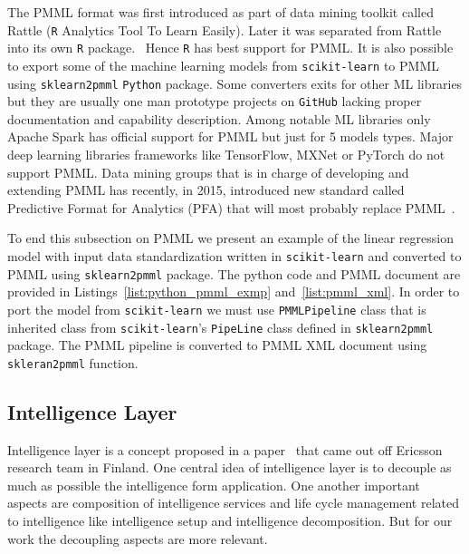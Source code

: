\documentclass[english, 12pt, a4paper, elec, utf8, online]{aaltothesis}
\begin{document}
The PMML format was first introduced as part of data mining toolkit called Rattle (\texttt{R} Analytics Tool To Learn Easily). Later it was separated from Rattle into its own \texttt{R} package.~\cite{guazzelli2009pmml} Hence \texttt{R} has best support for PMML. It is also possible to export some of the machine learning models from \texttt{scikit-learn} to PMML using \texttt{sklearn2pmml} \texttt{Python} package. Some converters exits for other ML libraries but they are usually one man prototype projects on \texttt{GitHub} lacking proper documentation and capability description. Among notable ML libraries only Apache Spark has official support for PMML but just for 5 models types. Major deep learning libraries frameworks like TensorFlow, MXNet or PyTorch do not support PMML. Data mining groups that is in charge of developing and extending PMML has recently, in 2015, introduced new standard called Predictive Format for Analytics (PFA) that will most probably replace PMML~\cite{pfa}.  



To end this subsection on PMML we present an example of the linear regression model with input data standardization written in \texttt{scikit-learn} and converted to PMML using \texttt{sklearn2pmml} package. The python code and PMML document are provided in Listings~\ref{list:python_pmml_exmp} and~\ref{list:pmml_xml}. In order to port the model from \texttt{scikit-learn} we must use \texttt{PMMLPipeline} class that is inherited class from \texttt{scikit-learn}'s \texttt{PipeLine} class defined in \texttt{sklearn2pmml} package. The PMML pipeline is converted to PMML XML document using \texttt{skleran2pmml} function. 



\subsection{Intelligence Layer}
Intelligence layer is a concept proposed in a paper~\cite{edgar2019} that came out off Ericsson research team in Finland. One central idea of intelligence layer is to decouple as much as possible the intelligence form application. One another important aspects are composition of intelligence services and life cycle management related to intelligence like intelligence setup and intelligence decomposition. But for our work the decoupling aspects are more relevant.
\end{document}
